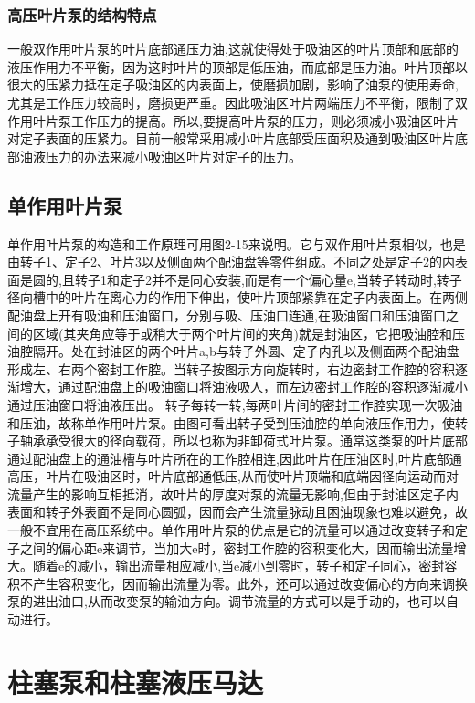 \subsubsection{高压叶片泵的结构特点}

一般双作用叶片泵的叶片底部通压力油,这就使得处于吸油区的叶片顶部和底部的液压作用力不平衡，因为这时叶片的顶部是低压油，而底部是压力油。叶片顶部以很大的压紧力抵在定子吸油区的内表面上，使磨损加剧，影响了油泵的使用寿命,尤其是工作压力较高时，磨损更严重。因此吸油区叶片两端压力不平衡，限制了双作用叶片泵工作压力的提高。所以,要提高叶片泵的压力，则必须减小吸油区叶片对定子表面的压紧力。目前一般常采用减小叶片底部受压面积及通到吸油区叶片底部油液压力的办法来减小吸油区叶片对定子的压力。

\subsection{单作用叶片泵}

单作用叶片泵的构造和工作原理可用图2-15来说明。它与双作用叶片泵相似，也是由转子1、定子2、叶片3以及侧面两个配油盘等零件组成。不同之处是定子2的内表面是圆的,且转子1和定子2并不是同心安装,而是有一个偏心量e,当转子转动时,转子径向槽中的叶片在离心力的作用下伸出，使叶片顶部紧靠在定子内表面上。在两侧配油盘上开有吸油和压油窗口，分别与吸、压油口连通,在吸油窗口和压油窗口之间的区域(其夹角应等于或稍大于两个叶片间的夹角)就是封油区，它把吸油腔和压油腔隔开。处在封油区的两个叶片a,b与转子外圆、定子内孔以及侧面两个配油盘形成左、右两个密封工作腔。当转子按图示方向旋转时，右边密封工作腔的容积逐渐增大，通过配油盘上的吸油窗口将油液吸人，而左边密封工作腔的容积逐渐减小通过压油窗口将油液压出。 转子每转一转,每两叶片间的密封工作腔实现一次吸油和压油，故称单作用叶片泵。由图可看出转子受到压油腔的单向液压作用力，使转子轴承承受很大的径向载荷，所以也称为非卸荷式叶片泵。通常这类泵的叶片底部通过配油盘上的通油槽与叶片所在的工作腔相连,因此叶片在压油区时,叶片底部通高压，叶片在吸油区时，叶片底部通低压,从而使叶片顶端和底端因径向运动而对流量产生的影响互相抵消，故叶片的厚度对泵的流量无影响,但由于封油区定子内表面和转子外表面不是同心圆弧，因而会产生流量脉动且困油现象也难以避免，故一般不宜用在高压系统中。单作用叶片泵的优点是它的流量可以通过改变转子和定子之间的偏心距e来调节，当加大e时，密封工作腔的容积变化大，因而输出流量增大。随着e的减小，输出流量相应减小,当e减小到零时，转子和定子同心，密封容积不产生容积变化，因而输出流量为零。此外，还可以通过改变偏心的方向来调换泵的进出油口,从而改变泵的输油方向。调节流量的方式可以是手动的，也可以自动进行。

\section{柱塞泵和柱塞液压马达}

